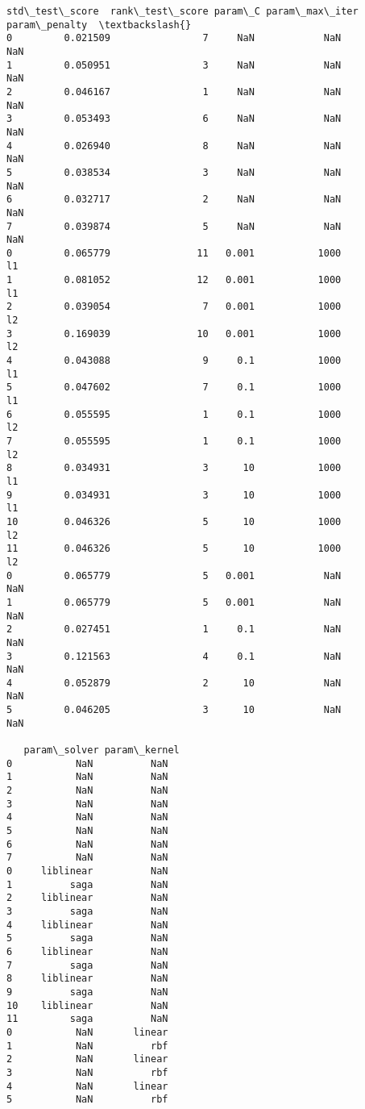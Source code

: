 \documentclass[11pt]{article}
\begin{document}
\begin{tcolorbox}[breakable, size=fbox, boxrule=.5pt, pad at break*=1mm, opacityfill=0]
\begin{Verbatim}[commandchars=\\\{\}]
    std\_test\_score  rank\_test\_score param\_C param\_max\_iter param\_penalty  \textbackslash{}
0         0.021509                7     NaN            NaN           NaN
1         0.050951                3     NaN            NaN           NaN
2         0.046167                1     NaN            NaN           NaN
3         0.053493                6     NaN            NaN           NaN
4         0.026940                8     NaN            NaN           NaN
5         0.038534                3     NaN            NaN           NaN
6         0.032717                2     NaN            NaN           NaN
7         0.039874                5     NaN            NaN           NaN
0         0.065779               11   0.001           1000            l1
1         0.081052               12   0.001           1000            l1
2         0.039054                7   0.001           1000            l2
3         0.169039               10   0.001           1000            l2
4         0.043088                9     0.1           1000            l1
5         0.047602                7     0.1           1000            l1
6         0.055595                1     0.1           1000            l2
7         0.055595                1     0.1           1000            l2
8         0.034931                3      10           1000            l1
9         0.034931                3      10           1000            l1
10        0.046326                5      10           1000            l2
11        0.046326                5      10           1000            l2
0         0.065779                5   0.001            NaN           NaN
1         0.065779                5   0.001            NaN           NaN
2         0.027451                1     0.1            NaN           NaN
3         0.121563                4     0.1            NaN           NaN
4         0.052879                2      10            NaN           NaN
5         0.046205                3      10            NaN           NaN

   param\_solver param\_kernel
0           NaN          NaN
1           NaN          NaN
2           NaN          NaN
3           NaN          NaN
4           NaN          NaN
5           NaN          NaN
6           NaN          NaN
7           NaN          NaN
0     liblinear          NaN
1          saga          NaN
2     liblinear          NaN
3          saga          NaN
4     liblinear          NaN
5          saga          NaN
6     liblinear          NaN
7          saga          NaN
8     liblinear          NaN
9          saga          NaN
10    liblinear          NaN
11         saga          NaN
0           NaN       linear
1           NaN          rbf
2           NaN       linear
3           NaN          rbf
4           NaN       linear
5           NaN          rbf
\end{Verbatim}
\end{tcolorbox}
        
\end{document}
